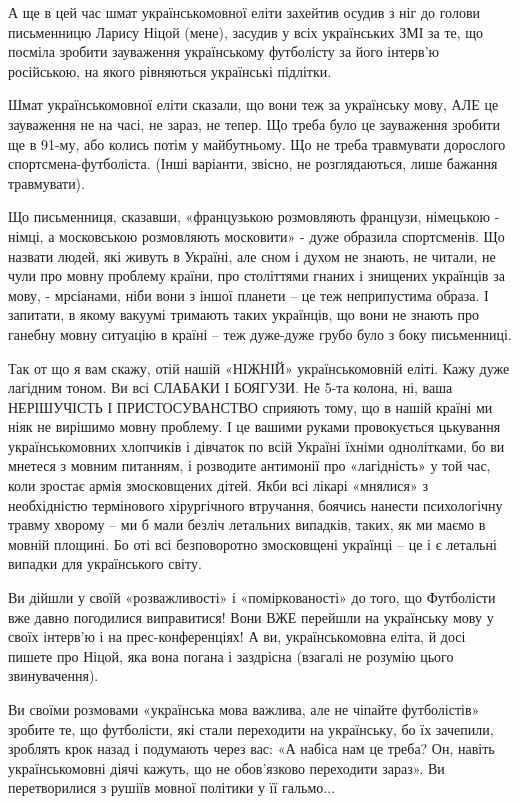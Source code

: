 А ще в цей час шмат українськомовної еліти захейтив осудив з ніг до голови
письменницю Ларису Ніцой (мене), засудив  у всіх українських ЗМІ за те, що
посміла зробити зауваження українському футболісту за його інтерв’ю російською,
на якого рівняються українські підлітки.

Шмат українськомовної еліти сказали, що вони теж за українську мову, АЛЕ це
зауваження не на часі, не зараз, не тепер. Що треба було це зауваження зробити
ще в 91-му, або колись потім у майбутньому. Що не треба травмувати дорослого
спортсмена-футболіста. (Інші варіанти, звісно, не розглядаються, лише бажання
травмувати).

Що письменниця, сказавши, «французькою розмовляють французи, німецькою - німці,
а московською розмовляють московити» - дуже образила спортсменів. Що назвати
людей, які живуть в Україні, але сном і духом не знають, не читали, не чули про
мовну проблему країни, про століттями гнаних і знищених українців за мову, -
мрсіанами, ніби вони з іншої планети – це теж неприпустима образа. І запитати,
в якому вакуумі тримають таких українців, що вони не знають про ганебну мовну
ситуацію в країні – теж дуже-дуже грубо було з боку письменниці. 

Так от що я вам скажу, отій нашій «НІЖНІЙ» українськомовній еліті. Кажу дуже
лагідним тоном. Ви всі СЛАБАКИ І БОЯГУЗИ. Не 5-та колона, ні, ваша НЕРІШУЧІСТЬ
І ПРИСТОСУВАНСТВО  сприяють тому, що в нашій країні ми ніяк не вирішимо мовну
проблему. І це вашими руками провокується цькування українськомовних хлопчиків
і дівчаток по всій Україні їхніми однолітками, бо ви мнетеся з мовним питанням,
і розводите антимонії про «лагідність» у той час, коли зростає армія
змосковщених дітей. Якби всі лікарі «мнялися» з необхідністю термінового
хірургічного втручання, боячись нанести психологічну травму хворому – ми б мали
безліч летальних випадків, таких, як ми маємо в мовній площині. Бо оті всі
безповоротно змосковщені українці – це і є летальні випадки для українського
світу. 

Ви дійшли у своїй «розважливості» і «поміркованості» до того, що Футболісти вже
давно погодилися виправитися! Вони ВЖЕ перейшли на українську мову у своїх
інтерв’ю і на прес-конференціях! А ви, українськомовна еліта, й досі пишете про
Ніцой, яка вона погана і заздрісна (взагалі не розумію цього звинувачення).

Ви своїми розмовами «українська мова важлива, але не чіпайте футболістів»
зробите те, що футболісти, які стали переходити на українську, бо їх зачепили,
зроблять крок назад і подумають через вас: «А набіса нам це треба? Он, навіть
українськомовні діячі кажуть, що не обов’язково переходити зараз». Ви
перетворилися з рушіїв мовної політики у її гальмо...

